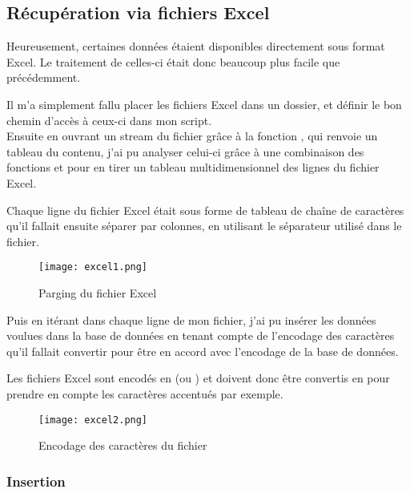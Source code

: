\subsection{Récupération via fichiers Excel}
\vspace{1cm}

Heureusement, certaines données étaient disponibles directement sous format Excel. Le traitement de celles-ci était donc beaucoup plus facile que précédemment.

Il m’a simplement fallu placer les fichiers Excel dans un dossier, et définir le bon chemin d’accès à ceux-ci dans mon script. \\

Ensuite en ouvrant un stream du fichier grâce à la fonction  , qui renvoie un tableau du contenu, j’ai pu analyser celui-ci grâce à une combinaison des fonctions  et  pour en tirer un tableau multidimensionnel des lignes du fichier Excel.

Chaque ligne du fichier Excel était sous forme de tableau de chaîne de caractères qu’il fallait ensuite séparer par colonnes, en utilisant le séparateur utilisé dans le fichier.

\begin{figure}[!h]
    \centering
    \texttt{[image: excel1.png]}
    \caption{Parging du fichier Excel}
\end{figure}


Puis en itérant dans chaque ligne de mon fichier, j’ai pu insérer les données voulues dans la base de données en tenant compte de l’encodage des caractères qu’il fallait convertir pour être en accord avec l’encodage de la base de données.


\begin{commentaire}
    Les fichiers Excel sont encodés en  (ou ) et doivent donc être convertis en  pour prendre en compte les caractères accentués par exemple.
\end{commentaire}


\begin{figure}[!h]
    \centering
    \texttt{[image: excel2.png]}
    \caption{Encodage des caractères du fichier}
\end{figure}

\newpage

\subsubsection{Insertion}
\vspace{1cm}

